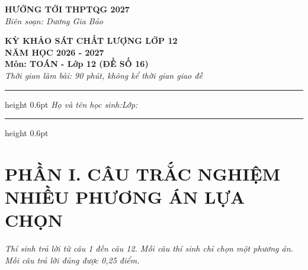 \documentclass[12pt,a4paper]{article}
\begin{document}
\thispagestyle{firstpage}
\noindent
\begin{minipage}[t]{0.35\textwidth}
    \centering
    {\fontsize{13}{15}\selectfont\textbf{HƯỚNG TỚI THPTQG 2027}}\\[5pt]
    \textit{Biên soạn: Dương Gia Bảo}\\[6pt]
    \setlength{\fboxrule}{0.8pt}%
    \setlength{\fboxsep}{5pt}%
\end{minipage}\hfill
\begin{minipage}[t]{0.63\textwidth}
    \centering
    {\fontsize{13}{15}\selectfont\textbf{KỲ KHẢO SÁT CHẤT LƯỢNG LỚP 12}\\[2pt]
    \textbf{NĂM HỌC 2026 - 2027}}\\[6pt]
    {\fontsize{14}{16}\selectfont\textbf{Môn: TOÁN - Lớp 12 (ĐỀ SỐ 16)}}\\[5pt]
    {\fontsize{11.5}{13}\selectfont\textit{Thời gian làm bài: 90 phút, không kể thời gian giao đề}}\\[6pt]
    \setlength{\fboxrule}{0.8pt}%
    \setlength{\fboxsep}{6pt}%
\end{minipage}
\par\vspace{3pt}
\hrule height 0.6pt
\vspace{4pt}
\noindent\textit{Họ và tên học sinh:}\dotfill\hspace{1cm}\textit{Lớp:}\makebox[3.5cm]{\dotfill}
\par\vspace{3pt}
\hrule height 0.6pt
\vspace{4pt}

\section*{\large PHẦN I. CÂU TRẮC NGHIỆM NHIỀU PHƯƠNG ÁN LỰA CHỌN}
\textit{Thí sinh trả lời từ câu 1 đến câu 12. Mỗi câu thí sinh chỉ chọn một phương án. Mỗi câu trả lời đúng được 0,25 điểm.}
\end{document}
